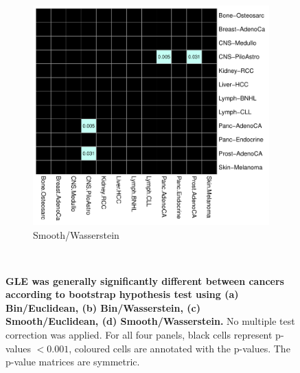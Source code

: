 \begin{figure}[ht!]
\begin{subfigure}{.55\textwidth}
    \includegraphics[scale=0.65]{graphics/bootstrap_smooth_wasserstein.pdf}
    \caption{Smooth/Wasserstein}
    \label{fig:smooth_wasserstein}
    \end{subfigure} \\
    
    \caption{\textbf{GLE was generally significantly different between cancers according to bootstrap hypothesis test using (a) Bin/Euclidean, (b) Bin/Wasserstein, (c) Smooth/Euclidean, (d) Smooth/Wasserstein.} No multiple test correction was applied. For all four panels, black cells represent p-values $<0.001$, coloured cells are annotated with the p-values. The p-value matrices are symmetric.}
    \label{fig:gle_bootstrap}
\end{figure}